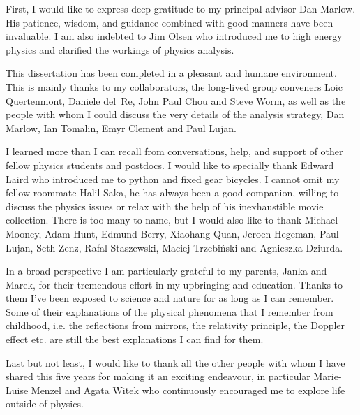 
First, I would like to express deep gratitude to my principal advisor Dan Marlow. His patience,
wisdom, and guidance combined with good manners have been invaluable. 
I am also indebted to Jim Olsen who introduced me to high energy physics and clarified the workings
of physics analysis.


This dissertation has been completed in a pleasant and humane environment. This is mainly
thanks to my collaborators, the
long-lived group conveners Loic Quertenmont, Daniele del~Re, John Paul Chou and Steve Worm,
as well as the people with whom I could discuss the very details of the analysis strategy,
Dan Marlow, Ian Tomalin, Emyr Clement and Paul Lujan.

I learned more than I can recall from conversations, help, and support of other fellow
physics students and postdocs. I would like to specially thank Edward Laird who introduced
me to python and fixed gear bicycles. I cannot omit my fellow roommate Halil Saka, he has always been a good companion,
willing to discuss the physics issues or relax with the help of his inexhaustible movie collection.
There is too many to name, but I would also like to thank Michael Mooney, Adam Hunt, Edmund Berry, Xiaohang Quan, Jeroen Hegeman, Paul Lujan, Seth Zenz,
Rafal Staszewski, Maciej Trzebi\'nski and Agnieszka Dziurda. 

In a broad perspective I am particularly grateful to my parents, Janka and Marek, for their tremendous effort in my upbringing and education.
 Thanks to them I've been exposed to science and nature for as long as I can remember. Some of their explanations of the physical phenomena that I remember from childhood,
i.e. the reflections from mirrors, the relativity principle, the Doppler effect etc.
are still the best explanations I can find for them.

Last but not least, I would like to thank all the other people with whom I have shared 
this five years for making it an exciting endeavour, in particular Marie-Luise Menzel and Agata
Witek who continuously encouraged me to explore
life outside of physics.
